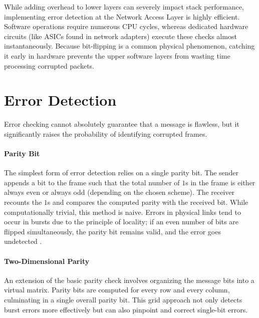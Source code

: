 While adding overhead to lower layers can severely impact stack performance, implementing error detection at the Network Access Layer is highly efficient. Software operations require numerous CPU cycles, whereas dedicated hardware circuits (like ASICs found in network adapters) execute these checks almost instantaneously. Because bit-flipping is a common physical phenomenon, catching it early in hardware prevents the upper software layers from wasting time processing corrupted packets.

\section{Error Detection}
Error checking cannot absolutely guarantee that a message is flawless, but it significantly raises the probability of identifying corrupted frames.

\paragraph{Parity Bit}
The simplest form of error detection relies on a single parity bit. The sender appends a bit to the frame such that the total number of \(1\)s in the frame is either always even or always odd (depending on the chosen scheme). The receiver recounts the \(1\)s and compares the computed parity with the received bit. 
While computationally trivial, this method is naive. Errors in physical links tend to occur in bursts due to the principle of locality; if an even number of bits are flipped simultaneously, the parity bit remains valid, and the error goes undetected \cite{kurose2017}.

\paragraph{Two-Dimensional Parity}
An extension of the basic parity check involves organizing the message bits into a virtual matrix. Parity bits are computed for every row and every column, culminating in a single overall parity bit. This grid approach not only detects burst errors more effectively but can also pinpoint and correct single-bit errors.

